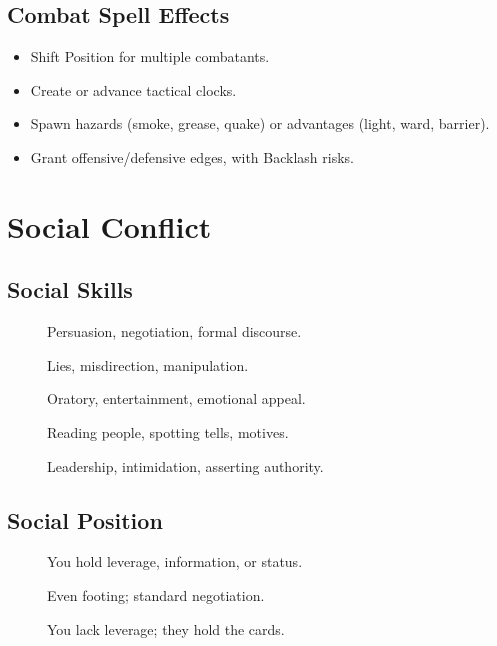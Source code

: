 \subsection{Combat Spell Effects}
\label{subsec:spell-effects}

\begin{itemize}
  \item Shift Position for multiple combatants.
  \item Create or advance tactical clocks.
  \item Spawn hazards (smoke, grease, quake) or advantages (light, ward, barrier).
  \item Grant offensive/defensive edges, with Backlash risks. 
\end{itemize}

\section{Social Conflict}
\label{sec:social-conflict}

\subsection{Social Skills}
\label{subsec:social-skills}

\begin{description}
  \item[] Persuasion, negotiation, formal discourse. 
  \item[] Lies, misdirection, manipulation. 
  \item[] Oratory, entertainment, emotional appeal. 
  \item[] Reading people, spotting tells, motives. 
  \item[] Leadership, intimidation, asserting authority. 
\end{description}

\subsection{Social Position}
\label{subsec:social-position}

\begin{description}
  \item[] You hold leverage, information, or status. 
  \item[] Even footing; standard negotiation. 
  \item[] You lack leverage; they hold the cards. 
\end{description}

